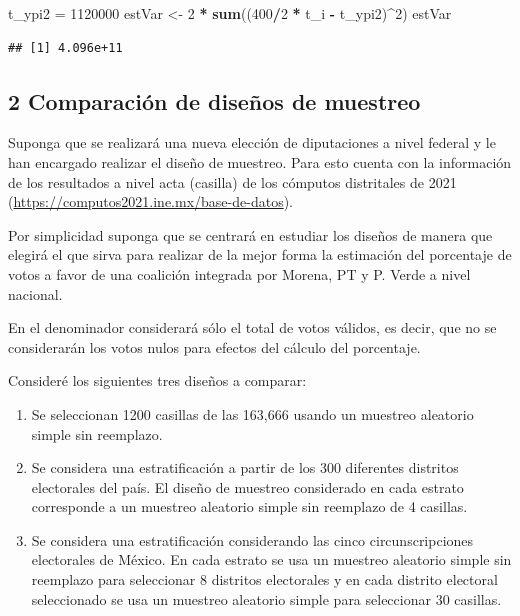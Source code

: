 \documentclass[
]{article}
\newenvironment{Shaded}{\begin{snugshade}}{\end{snugshade}}
\newcommand{\DecValTok}[1]{\textcolor[rgb]{0.00,0.00,0.81}{#1}}
\newcommand{\KeywordTok}[1]{\textcolor[rgb]{0.13,0.29,0.53}{\textbf{#1}}}
\newcommand{\NormalTok}[1]{#1}
\newcommand{\OperatorTok}[1]{\textcolor[rgb]{0.81,0.36,0.00}{\textbf{#1}}}
\newcommand{\StringTok}[1]{\textcolor[rgb]{0.31,0.60,0.02}{#1}}
\providecommand{\tightlist}{%
  \setlength{\itemsep}{0pt}\setlength{\parskip}{0pt}}
\begin{document}
\begin{Shaded}
\begin{Highlighting}[]
\NormalTok{t_ypi2 =}\StringTok{ }\DecValTok{1120000}
\NormalTok{estVar <-}\StringTok{ }\DecValTok{2} \OperatorTok{*}\StringTok{ }\KeywordTok{sum}\NormalTok{((}\DecValTok{400}\OperatorTok{/}\DecValTok{2} \OperatorTok{*}\StringTok{ }\NormalTok{t_i }\OperatorTok{-}\StringTok{ }\NormalTok{t_ypi2)}\OperatorTok{^}\DecValTok{2}\NormalTok{)}
\NormalTok{estVar}
\end{Highlighting}
\end{Shaded}

\begin{verbatim}
## [1] 4.096e+11
\end{verbatim}

\hypertarget{comparaciuxf3n-de-diseuxf1os-de-muestreo}{%
\subsection{2 Comparación de diseños de
muestreo}\label{comparaciuxf3n-de-diseuxf1os-de-muestreo}}

Suponga que se realizará una nueva elección de diputaciones a nivel
federal y le han encargado realizar el diseño de muestreo. Para esto
cuenta con la información de los resultados a nivel acta (casilla) de
los cómputos distritales de 2021
(\url{https://computos2021.ine.mx/base-de-datos}).

Por simplicidad suponga que se centrará en estudiar los diseños de
manera que elegirá el que sirva para realizar de la mejor forma la
estimación del porcentaje de votos a favor de una coalición integrada
por Morena, PT y P. Verde a nivel nacional.

En el denominador considerará sólo el total de votos válidos, es decir,
que no se considerarán los votos nulos para efectos del cálculo del
porcentaje.

Consideré los siguientes tres diseños a comparar:

\begin{enumerate}
\def\labelenumi{\roman{enumi}.}
\tightlist
\item
  Se seleccionan 1200 casillas de las 163,666 usando un muestreo
  aleatorio simple sin reemplazo.
\item
  Se considera una estratificación a partir de los 300 diferentes
  distritos electorales del país. El diseño de muestreo considerado en
  cada estrato corresponde a un muestreo aleatorio simple sin reemplazo
  de 4 casillas.
\item
  Se considera una estratificación considerando las cinco
  circunscripciones electorales de México. En cada estrato se usa un
  muestreo aleatorio simple sin reemplazo para seleccionar 8 distritos
  electorales y en cada distrito electoral seleccionado se usa un
  muestreo aleatorio simple para seleccionar 30 casillas.
\end{enumerate}
\end{document}
